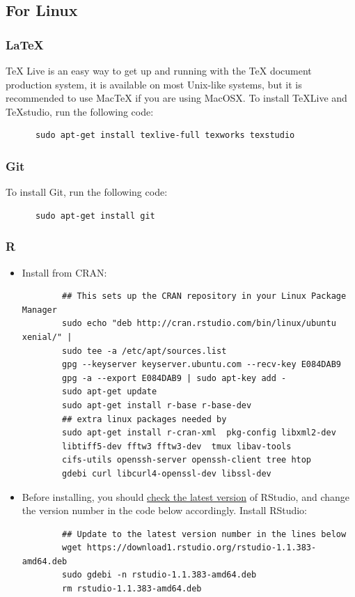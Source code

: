 \documentclass[11pt]{article} %
\begin{document}
  \subsection{For Linux}
  
    \subsubsection{LaTeX}
    
      TeX Live is an easy way to get up and running with the TeX document production system, it is available on most Unix-like systems, but it is recommended to use MacTeX if you are using MacOSX. 
      To install TeXLive and TeXstudio, run the following code:
      \begin{lstlisting}
      sudo apt-get install texlive-full texworks texstudio
      \end{lstlisting}
      \subsubsection{Git}
      To install Git, run the following code:
      \begin{lstlisting}
      sudo apt-get install git
      \end{lstlisting}
      
    \subsubsection{R}
    
      \begin{itemize}
        \item Install from CRAN:
        \begin{lstlisting}
        ## This sets up the CRAN repository in your Linux Package Manager
        sudo echo "deb http://cran.rstudio.com/bin/linux/ubuntu xenial/" | 
        sudo tee -a /etc/apt/sources.list
        gpg --keyserver keyserver.ubuntu.com --recv-key E084DAB9
        gpg -a --export E084DAB9 | sudo apt-key add -
        sudo apt-get update
        sudo apt-get install r-base r-base-dev
        ## extra linux packages needed by
        sudo apt-get install r-cran-xml  pkg-config libxml2-dev
        libtiff5-dev fftw3 fftw3-dev  tmux libav-tools
        cifs-utils openssh-server openssh-client tree htop
        gdebi curl libcurl4-openssl-dev libssl-dev
        \end{lstlisting}
        \item Before installing, you should \href{https://www.rstudio.com/products/rstudio/download/}{check the latest version} of RStudio, and change the version number in the code below accordingly. 
        Install RStudio:
        \begin{lstlisting} 
        ## Update to the latest version number in the lines below
        wget https://download1.rstudio.org/rstudio-1.1.383-amd64.deb
        sudo gdebi -n rstudio-1.1.383-amd64.deb
        rm rstudio-1.1.383-amd64.deb
        \end{lstlisting}
        
      \end{itemize}
  
\end{document}
